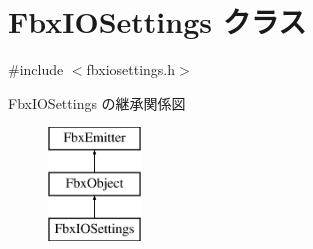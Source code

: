 \hypertarget{class_fbx_i_o_settings}{}\section{Fbx\+I\+O\+Settings クラス}
\label{class_fbx_i_o_settings}


{\ttfamily \#include $<$fbxiosettings.\+h$>$}

Fbx\+I\+O\+Settings の継承関係図\begin{figure}[H]
\begin{center}
\leavevmode
\includegraphics[height=3.000000cm]{class_fbx_i_o_settings}
\end{center}
\end{figure}
